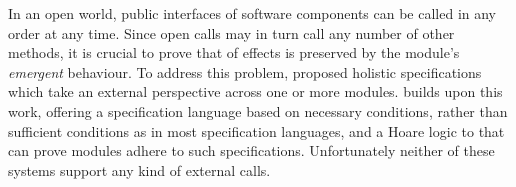 In an open world, public interfaces of software components can be
called in any order at any time. 
Since open calls may in turn call any number of other 
methods, it is crucial to prove that \taming of effects is preserved
by the module's \emph{emergent} behaviour.
%
%
%
%
%
%
%
%
To address this problem, 
\citet{FASE}  proposed holistic specifications which take an external
perspective across one or more modules.
\citet{OOPSLA22} builds upon this work, offering a specification
language based on necessary conditions, rather than sufficient
conditions as in most specification languages, and a Hoare logic to 
that can prove modules  adhere to such specifications. Unfortunately
neither of these systems support any kind of external calls.


